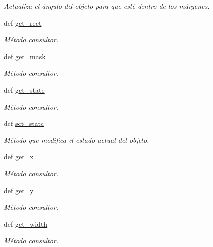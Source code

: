 \begin{DoxyCompactItemize}
\begin{DoxyCompactList}\small\item\em \-Actualiza el ángulo del objeto para que esté dentro de los márgenes. \end{DoxyCompactList}\item 
def \hyperlink{classengine_1_1gameobject_1_1GameObject_ae89effdcf5d3e0f52f55672232a001f1}{get\-\_\-rect}
\begin{DoxyCompactList}\small\item\em \-Método consultor. \end{DoxyCompactList}\item 
def \hyperlink{classengine_1_1gameobject_1_1GameObject_a267febcfeb804cd47c7684c33cfba5b9}{get\-\_\-mask}
\begin{DoxyCompactList}\small\item\em \-Método consultor. \end{DoxyCompactList}\item 
def \hyperlink{classengine_1_1gameobject_1_1GameObject_a0bd4fd1a059246f6d0f73cba9b8a95f8}{get\-\_\-state}
\begin{DoxyCompactList}\small\item\em \-Método consultor. \end{DoxyCompactList}\item 
def \hyperlink{classengine_1_1gameobject_1_1GameObject_a0037c475d6f184612c2def68a1379600}{set\-\_\-state}
\begin{DoxyCompactList}\small\item\em \-Método que modifica el estado actual del objeto. \end{DoxyCompactList}\item 
def \hyperlink{classengine_1_1gameobject_1_1GameObject_a3d7daed1debcc083286ef775a3a2851b}{get\-\_\-x}
\begin{DoxyCompactList}\small\item\em \-Método consultor. \end{DoxyCompactList}\item 
def \hyperlink{classengine_1_1gameobject_1_1GameObject_aecaab958d61e0d22f690f893b79c16f1}{get\-\_\-y}
\begin{DoxyCompactList}\small\item\em \-Método consultor. \end{DoxyCompactList}\item 
def \hyperlink{classengine_1_1gameobject_1_1GameObject_af2b6bdf6429a41a9bda5c9b7f12ac52d}{get\-\_\-width}
\begin{DoxyCompactList}\small\item\em \-Método consultor. \end{DoxyCompactList}\item 

\end{DoxyCompactItemize}
